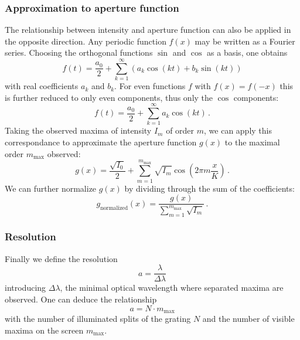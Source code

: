\subsubsection{Approximation to aperture function}
The relationship between intensity and aperture function can also be applied in the 
opposite direction. Any periodic function $f(x)$ may be written as a Fourier series. 
Choosing the orthogonal functions $\sin$ and $\cos$ as a basis, one obtains 
\begin{equation}
    f(t)=\frac{a_{0}}{2}+\sum_{k=1}^{\infty}\left(a_{k}\cos\left(kt\right)+b_{k}\sin\left(kt\right)\right)
    \label{eq:fourier_series}
\end{equation}
with real coefficients $a_k$ and $b_k$. For even functions $f$ with $f(x) = f(-x)$ 
this is further reduced to only even components, thus only the $\cos$ components:
\begin{equation}
    f(t)=\frac{a_{0}}{2}+\sum_{k=1}^{\infty} a_{k}\cos\left(kt\right)\, .
    \label{eq:fourier_series_even}
\end{equation}
Taking the observed maxima of intensity $I_m$ of order $m$, we can 
apply this correspondance to approximate the aperture function $g(x)$ 
to the maximal order $m_\mathrm{max}$ observed:
\begin{equation}
    g(x)=\frac{\sqrt{I_{0}}}{2}+\sum_{m=1}^{m_\mathrm{max}} \sqrt{I_m}\cos\left(2 \pi m \frac{x}{K}\right)\, .
    \label{eq:g_approx}
\end{equation}
We can further normalize $g(x)$ by dividing through the sum of the coefficients:
\begin{equation}
    g_\mathrm{normalized}(x)=\frac{g(x)}{\sum_{m=1}^{m_\mathrm{max}} \sqrt{I_m}}\, .
    \label{eq:g_approx}
\end{equation}

\subsubsection{Resolution}
\label{sec:resolution}
Finally we define the resolution
\begin{equation}
    a = \frac{\lambda}{\Delta \lambda}
\end{equation}
introducing $\Delta \lambda$, the minimal optical wavelength where separated maxima 
are observed. One can deduce the relationship
\begin{equation}
    a = N \cdot m_\mathrm{max}
    \label{eq:resolution}
\end{equation}
with the number of illuminated splits of the grating $N$ and the number of 
visible maxima on the screen $m_\mathrm{max}$.\cite{ver}
\clearpage

